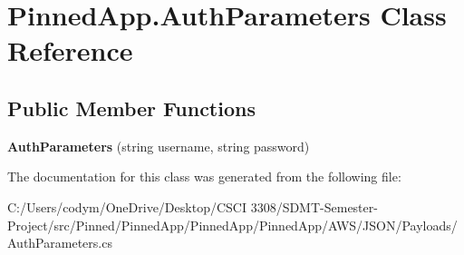 \hypertarget{class_pinned_app_1_1_auth_parameters}{}\section{Pinned\+App.\+Auth\+Parameters Class Reference}
\label{class_pinned_app_1_1_auth_parameters}
\subsection*{Public Member Functions}
\begin{DoxyCompactItemize}
\item 
\mbox{\label{class_pinned_app_1_1_auth_parameters_a4af9959c4d7be0648284f4098282f624}} 
{\bfseries Auth\+Parameters} (string username, string password)
\end{DoxyCompactItemize}


The documentation for this class was generated from the following file\+:\begin{DoxyCompactItemize}
\item 
C\+:/\+Users/codym/\+One\+Drive/\+Desktop/\+C\+S\+C\+I 3308/\+S\+D\+M\+T-\/\+Semester-\/\+Project/src/\+Pinned/\+Pinned\+App/\+Pinned\+App/\+Pinned\+App/\+A\+W\+S/\+J\+S\+O\+N/\+Payloads/Auth\+Parameters.\+cs\end{DoxyCompactItemize}

